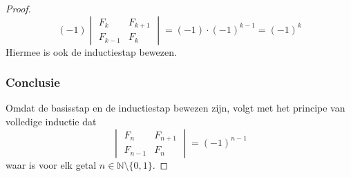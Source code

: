 \documentclass[10pt,a4paper]{article}
\begin{document}
\begin{proof}
\[
(-1)
\begin{vmatrix}
F_{k} & F_{k+1}\\
F_{k-1}   & F_{k}
\end{vmatrix}
= (-1)\cdot(-1)^{k-1}
= (-1)^{k}
\]
Hiermee is ook de inductiestap bewezen.

\subsubsection*{Conclusie}
Omdat de basisstap en de inductiestap bewezen zijn, volgt met het principe van volledige inductie dat
\[
\begin{vmatrix}
F_{n}   & F_{n+1}\\
F_{n-1} & F_{n}
\end{vmatrix}
=
(-1)^{n-1}
\]
waar is voor elk getal $n \in \mathbb{N}\setminus\{0,1\}$. 
\end{proof}
\end{document}
